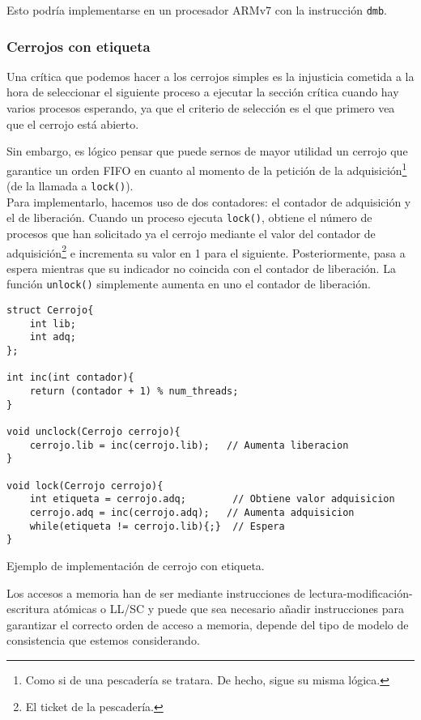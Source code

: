 Esto podría implementarse en un procesador ARMv7 con la instrucción \verb|dmb|.

\subsubsection{Cerrojos con etiqueta}
Una crítica que podemos hacer a los cerrojos simples es la injusticia cometida a la hora de seleccionar el siguiente proceso a ejecutar la sección crítica cuando hay varios procesos esperando, ya que el criterio de selección es el que primero vea que el cerrojo está abierto. 

Sin embargo, es lógico pensar que puede sernos de mayor utilidad un cerrojo que garantice un orden FIFO en cuanto al momento de la petición de la adquisición\footnote{Como si de una pescadería se tratara. De hecho, sigue su misma lógica.} (de la llamada a \verb|lock()|).\\

Para implementarlo, hacemos uso de dos contadores: el contador de adquisición y el de liberación. Cuando un proceso ejecuta \verb|lock()|, obtiene el número de procesos que han solicitado ya el cerrojo mediante el valor del contador de adquisición\footnote{El ticket de la pescadería.} e incrementa su valor en 1 para el siguiente. Posteriormente, pasa a espera mientras que su indicador no coincida con el contador de liberación. La función \verb|unlock()| simplemente aumenta en uno el contador de liberación.

\begin{listing}[H]
\begin{verbatim}
struct Cerrojo{
    int lib;
    int adq;
};

int inc(int contador){
    return (contador + 1) % num_threads;
}

void unclock(Cerrojo cerrojo){
    cerrojo.lib = inc(cerrojo.lib);   // Aumenta liberacion
}

void lock(Cerrojo cerrojo){
    int etiqueta = cerrojo.adq;        // Obtiene valor adquisicion
    cerrojo.adq = inc(cerrojo.adq);   // Aumenta adquisicion
    while(etiqueta != cerrojo.lib){;}  // Espera
}
\end{verbatim}
\caption{Ejemplo de implementación de cerrojo con etiqueta.}
\label{implementacion_cerrojo_etiqueta}
\end{listing}
Los accesos a memoria han de ser mediante instrucciones de lectura-modificación-escritura atómicas o LL/SC y puede que sea necesario añadir instrucciones para garantizar el correcto orden de acceso a memoria, depende del tipo de modelo de consistencia que estemos considerando.

